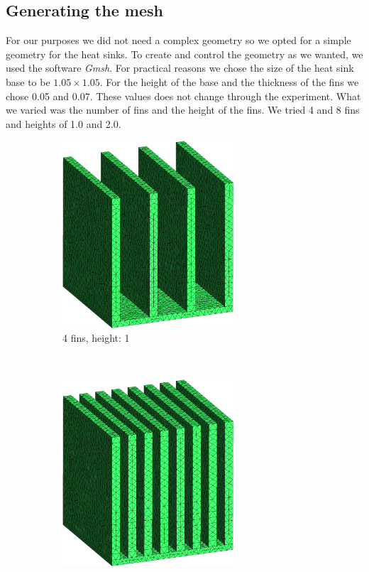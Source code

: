 \subsection{Generating the mesh}
 For our purposes we did not need a complex geometry so we opted for a simple geometry for the heat sinks. To create and control the geometry as we wanted, we used the software \textit{Gmsh}. For practical reasons we chose the size of the heat sink base to be $1.05\times1.05$. For the height of the base and the thickness of the fins we chose 0.05 and 0.07. These values does not change through the experiment. What we varied was the number of fins and the height of the fins. We tried 4 and 8 fins and heights of 1.0 and 2.0.

 \begin{figure}[h t!]
 \begin{subfigure}[t] {0.23\textwidth}
 \centering
 \includegraphics[width=0.7\textwidth]{"../figures/mesh_4_1 (new)"}
 \caption{4 fins, height: 1}
 \label{fig:mesh_4_1}
 \end{subfigure}
 ~
  \begin{subfigure}[t] {0.23\textwidth}
 \centering
 \includegraphics[width=0.7\textwidth]{"../figures/mesh_8_1 (new)"}

\end{subfigure}
\end{figure}
